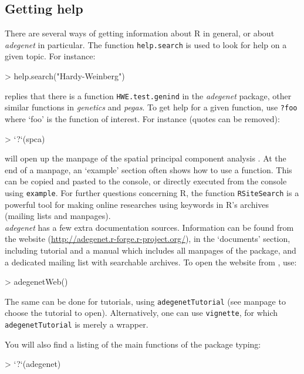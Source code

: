 \documentclass{article}
\begin{document}
\subsection{Getting help}
There are several ways of getting information about R in general, or about
\textit{adegenet} in particular.
The function \texttt{help.search} is used to look for help on a given topic.
For instance:
\begin{Schunk}
\begin{Sinput}
> help.search("Hardy-Weinberg")
\end{Sinput}
\end{Schunk}
replies that there is a function \texttt{HWE.test.genind} in the
\textit{adegenet} package, other similar functions in \textit{genetics} and \textit{pegas}.
To get help for a given function, use \texttt{?foo} where `foo' is the
function of interest.
For instance (quotes can be removed):
\begin{Schunk}
\begin{Sinput}
> `?`(spca)
\end{Sinput}
\end{Schunk}
will open up the manpage of the spatial principal component analysis \cite{tjart04}.
At the end of a manpage, an `example' section often shows how to use a function.
This can be copied and pasted to the console, or directly executed
from the console using \texttt{example}.
For further questions concerning R, the function \texttt{RSiteSearch}
is a powerful tool for making online researches using keywords in R's archives (mailing
lists and manpages).
\\


\textit{adegenet} has a few extra documentation sources.
Information can be found from the website
(\url{http://adegenet.r-forge.r-project.org/}), in the `documents'
section, including tutorial and a manual which includes all
manpages of the package, and a dedicated mailing list with searchable archives.
To open the website from \Rlogo, use:
\begin{Schunk}
\begin{Sinput}
> adegenetWeb()
\end{Sinput}
\end{Schunk}
The same can be done for tutorials, using \texttt{adegenetTutorial} (see
manpage to choose the tutorial to open).
Alternatively, one can use \texttt{vignette}, for which \texttt{adegenetTutorial} is merely a wrapper.

You will also find a listing of the main functions of the package typing:
\begin{Schunk}
\begin{Sinput}
> `?`(adegenet)
\end{Sinput}
\end{Schunk}
\end{document}
